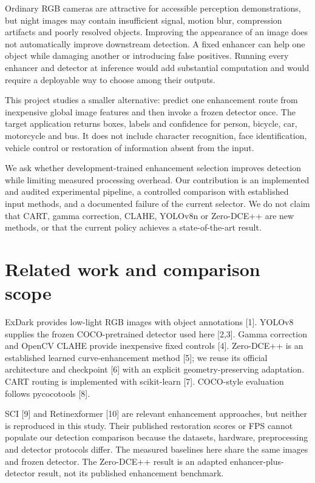 \documentclass[11pt,a4paper]{article}
\begin{document}
Ordinary RGB cameras are attractive for accessible perception demonstrations, but night images may contain insufficient signal, motion blur, compression artifacts and poorly resolved objects. Improving the appearance of an image does not automatically improve downstream detection. A fixed enhancer can help one object while damaging another or introducing false positives. Running every enhancer and detector at inference would add substantial computation and would require a deployable way to choose among their outputs.


This project studies a smaller alternative: predict one enhancement route from inexpensive global image features and then invoke a frozen detector once. The target application returns boxes, labels and confidence for person, bicycle, car, motorcycle and bus. It does not include character recognition, face identification, vehicle control or restoration of information absent from the input.


We ask whether development-trained enhancement selection improves detection while limiting measured processing overhead. Our contribution is an implemented and audited experimental pipeline, a controlled comparison with established input methods, and a documented failure of the current selector. We do not claim that CART, gamma correction, CLAHE, YOLOv8n or Zero-DCE++ are new methods, or that the current policy achieves a state-of-the-art result.


\section{Related work and comparison scope}

ExDark provides low-light RGB images with object annotations [1]. YOLOv8 supplies the frozen COCO-pretrained detector used here [2,3]. Gamma correction and OpenCV CLAHE provide inexpensive fixed controls [4]. Zero-DCE++ is an established learned curve-enhancement method [5]; we reuse its official architecture and checkpoint [6] with an explicit geometry-preserving adaptation. CART routing is implemented with scikit-learn [7]. COCO-style evaluation follows pycocotools [8].


SCI [9] and Retinexformer [10] are relevant enhancement approaches, but neither is reproduced in this study. Their published restoration scores or FPS cannot populate our detection comparison because the datasets, hardware, preprocessing and detector protocols differ. The measured baselines here share the same images and frozen detector. The Zero-DCE++ result is an adapted enhancer-plus-detector result, not its published enhancement benchmark.
\end{document}
